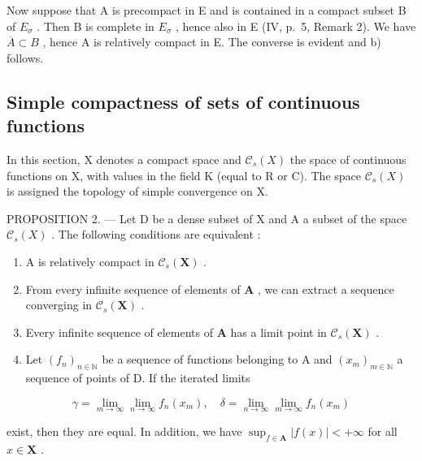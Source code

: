Now suppose that A is precompact in E and is contained in a compact subset B of \(E_{\sigma}\) . Then B is complete in \(E_{\sigma}\) , hence also in E (IV, p.~5, Remark 2). We have \(\overline{A} \subset B\) , hence A is relatively compact in E. The converse is evident and b) follows.

\subsection{Simple compactness of sets of continuous functions}

In this section, X denotes a compact space and \(\mathcal{C}_{s}(X)\) the space of continuous functions on X, with values in the field K (equal to R or C). The space \(\mathcal{C}_{s}(X)\) is assigned the topology of simple convergence on X.

PROPOSITION 2. --- Let D be a dense subset of X and A a subset of the space \(\mathcal{C}_{s}(X)\) . The following conditions are equivalent :

\begin{enumerate}
\def\labelenumi{(\roman{enumi})}
\item
  A is relatively compact in \(\mathcal{C}_s(\mathbf{X})\) .
\item
  From every infinite sequence of elements of \(\mathbf{A}\) , we can extract a sequence converging in \(\mathcal{C}_s(\mathbf{X})\) .
\item
  Every infinite sequence of elements of \(\mathbf{A}\) has a limit point in \(\mathcal{C}_s(\mathbf{X})\) .
\item
  Let \((f_n)_{n\in \mathbb{N}}\) be a sequence of functions belonging to A and \((x_m)_{m\in \mathbb{N}}\) a sequence of points of D. If the iterated limits
\end{enumerate}

\[
\gamma = \lim _ {m \rightarrow \infty} \lim _ {n \rightarrow \infty} f _ {n} (x _ {m}), \quad \delta = \lim _ {n \rightarrow \infty} \lim _ {m \rightarrow \infty} f _ {n} (x _ {m})
\]

exist, then they are equal. In addition, we have \(\sup_{f\in \mathbf{A}}|f(x)| < +\infty\) for all \(x\in \mathbf{X}\) .

